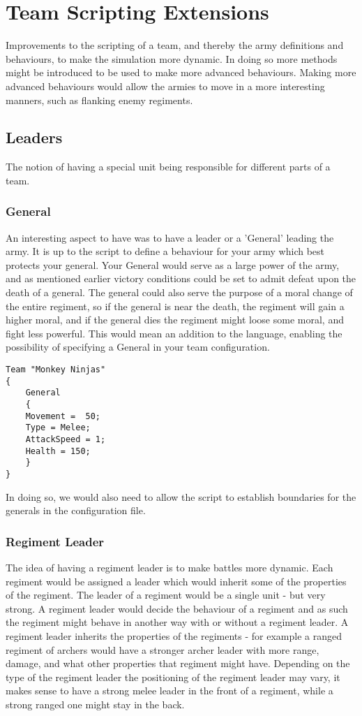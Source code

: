 \section{Team Scripting Extensions}
Improvements to the scripting of a team, and thereby the army definitions and behaviours, to make the simulation more dynamic. In doing so more methods might be introduced to be used to make more advanced behaviours. Making more advanced behaviours would allow the armies to move in a more interesting manners, such as flanking enemy regiments.
\subsection{Leaders}
The notion of having a special unit being responsible for different parts of a team.
\subsubsection*{General}
An interesting aspect to have was to have a leader or a 'General' leading the army. It is up to the script to define a behaviour for your army which best protects your general. Your General would serve as a large power of the army, and as mentioned earlier victory conditions could be set to admit defeat upon the death of a general.\label{moral} The general could also serve the purpose of a moral change of the entire regiment, so if the general is near the death, the regiment will gain a higher moral, and if the general dies the regiment might loose some moral, and fight less powerful. This would mean an addition to the language, enabling the possibility of specifying a General in your team configuration.
\begin{lstlisting}
Team "Monkey Ninjas"
{
	General
	{
	Movement =  50;
	Type = Melee;
	AttackSpeed = 1;
	Health = 150;
	}
}

\end{lstlisting}
In doing so, we would also need to allow the script to establish boundaries for the generals in the configuration file.
\subsubsection*{Regiment Leader}
The idea of having a regiment leader is to make battles more dynamic. Each regiment would be assigned a leader which would inherit some of the properties of the regiment.
The leader of a regiment would be a single unit - but very strong. A regiment leader would decide the behaviour of a regiment and as such the regiment might behave in another way with or without a regiment leader. A regiment leader inherits the properties of the regiments - for example a ranged regiment of archers would have a stronger archer leader with more range, damage, and what other properties that regiment might have. Depending on the type of the regiment leader the positioning of the regiment leader may vary, it makes sense to have a strong melee leader in the front of a regiment, while a strong ranged one might stay in the back.

